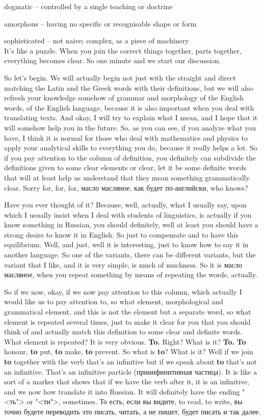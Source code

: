 \documentclass[main.tex]{subfiles}
\begin{document}
dogmatic -- controlled by a single teaching or doctrine

amorphous -- having no specific or recognisable shape or form

sophisticated -- not naive; complex, as a piece of machinery
\\

It's like a puzzle.
When you join the correct things together, parts together, everything becomes clear.
So one minute and we start our discussion.

So let's begin.
We will actually begin not just with the straight and direct matching the Latin and the Greek words with their definitions, but we will also refresh your knowledge somehow of grammar and morphology of the English words, of the English language, because it is also important when you deal with translating texts.
And okay, I will try to explain what I mean, and I hope that it will somehow help you in the future.
So, as you can see, if you analyze what you have, I think it is normal for those who deal with mathematics and physics to apply your analytical skills to everything you do, because it really helps a lot.
So if you pay attention to the column of definition, you definitely can subdivide the definitions given to some clear elements or clear, let it be some definite words that will at least help us understand that they mean something grammatically clear.
Sorry for, for, for, масло масляное, как будет по-английски, who knows?

Have you ever thought of it?
Because, well, actually, what I usually say, upon which I usually insist when I deal with students of linguistics, is actually if you know something in Russian, you should definitely, well at least you should have a strong desire to know it in English.
So just to compensate and to have this equilibrium.
Well, and just, well it is interesting, just to know how to say it in another language.
So one of the variants, there can be different variants, but the variant that I like, and it is very simple, is much of muchness.
So it is масло масляное, when you repeat something by means of repeating the words, actually.

So if we now, okay, if we now pay attention to this column, which actually I would like us to pay attention to, so what element, morphological and grammatical element, and this is not the element but a separate word, so what element is repeated several times, just to make it clear for you that you should think of and actually match this definition to some clear and definite words.
What element is repeated? It is very obvious.
\textbf{To.}
Right? What is it? \textbf{To.}
\textbf{To} honour, \textbf{to} put, \textbf{to} make, \textbf{to} prevent.
So what is \textbf{to}?
What is it?
Well if we join \textbf{to} together with the verb that's an infinitive but if we speak about \textbf{to} that's not an infinitive.
That's an infinitive particle (приинфинитивная частица).
It is like a sort of a marker that shows that if we have the verb after it, it is an infinitive, and we now how translate it into Russian.
It will definitely have the ending "<ть"> or "<ти">, sometimes.
То есть, если вы видите, to read, to write, вы точно будете переводить это писать, читать, а не пишет, будет писать и так далее.
\end{document}
